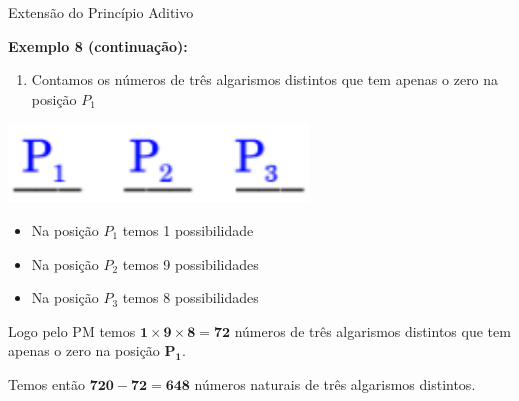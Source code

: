 \documentclass[aspectratio=169]{beamer}
\begin{document}
\begin{frame}{Extensão do Princípio Aditivo}

    \textbf{Exemplo 8 (continuação):}

\begin{enumerate}[2]
    \item Contamos os números de três algarismos distintos que tem apenas o zero na posição $P_1$
\end{enumerate} 

\begin{center}
    \includegraphics[width=0.25\linewidth]{figs/3digitos3.png}
\end{center}

\begin{itemize}
    \item Na posição $P_{1}$ temos 1 possibilidade
    \item Na posição $P_{2}$ temos 9 possibilidades
    \item Na posição $P_{3}$ temos 8 possibilidades
\end{itemize}
\vspace{2mm}

Logo pelo PM temos $\boldsymbol{1 \times 9 \times 8 = 72}$ números de três algarismos distintos que tem apenas o zero na posição $\boldsymbol{P_1}$.
\vspace{2mm}

Temos então $\boldsymbol{720 - 72  = 648}$ números naturais de três algarismos distintos.
\end{frame}
\end{document}
